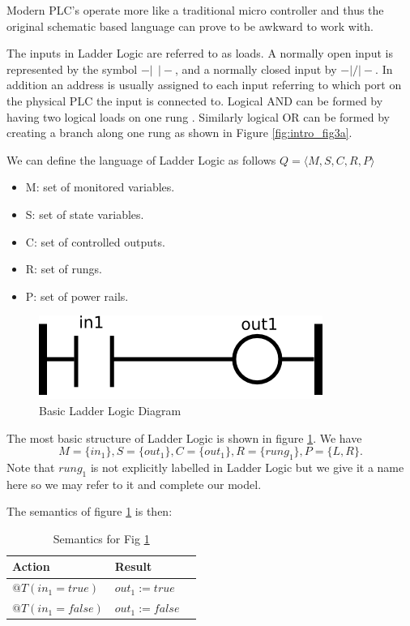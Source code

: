 Modern PLC's operate more like a traditional micro controller and thus the 
original schematic based language can prove to be awkward to work with.

The inputs in Ladder Logic are referred to as loads. A normally open input
is represented by the 
symbol $-\vert ~ ~ \vert-$, and a normally closed input by $-\vert/\vert-$.
In addition an address is usually assigned to each input referring to 
which port on the physical PLC the input is connected to. Logical AND 
can be formed by having two logical loads on one rung \cite{ebookmorris}. 
Similarly logical OR can be formed by creating a branch along one 
rung as shown in Figure \ref{fig:intro_fig3a}.

We can define the language of Ladder Logic as follows $Q = \langle M,S,C,R,P \rangle $

\begin{itemize}
	\item M: set of monitored variables.
	\item S: set of state variables.
	\item C: set of controlled outputs.
	\item R: set of rungs.
	\item P: set of power rails.
\end{itemize}

\begin{figure}[htp]
    \centering
    \includegraphics[width=\imgsmall]{./images/intro_fig1.png}
    \caption{Basic Ladder Logic Diagram}
    \label{fig:intro_fig1}
\end{figure}

The most basic structure of Ladder Logic is shown in figure \ref{fig:intro_fig1}. 
We have 
$$M=\lbrace in_1 \rbrace, S=\lbrace out_1 \rbrace, C=\lbrace out_1 \rbrace, R=\lbrace rung_1 \rbrace, P=\lbrace L,R \rbrace.$$
Note that $rung_1$ is not explicitly labelled in Ladder Logic but we give it a name here
so we may refer to it and complete our model.

The semantics of figure \ref{fig:intro_fig1} is then: 
\begin{table}[htp]
    \centering
    \begin{tabular}{|l|l|l|}
        \hline
        Action & Result \\
        \hline
        $@T(in_1 = true)$ & $out_1 := true$ \\
        \hline
        $@T(in_1 = false)$ & $out_1 := false$ \\
        \hline
    \end{tabular}
    \caption{Semantics for Fig \ref{fig:intro_fig1}}
    \label{table:table_for_fig1}
\end{table}


